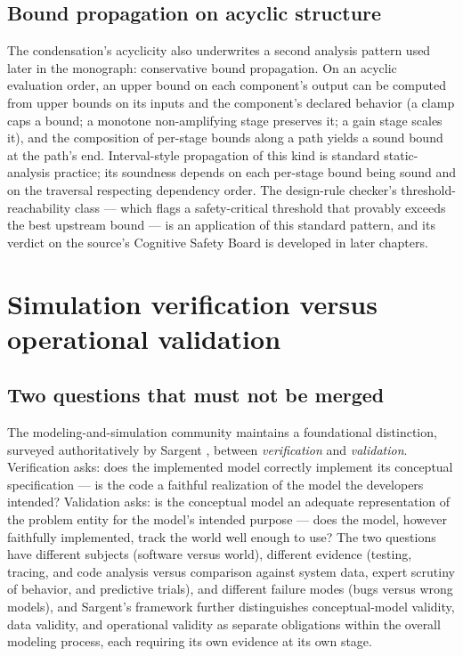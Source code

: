 \subsection{Bound propagation on acyclic structure}\label{ch02:graphs:bounds}

The condensation's acyclicity also underwrites a second analysis pattern
used later in the monograph: conservative bound propagation. On an
acyclic evaluation order, an upper bound on each component's output can
be computed from upper bounds on its inputs and the component's declared
behavior (a clamp caps a bound; a monotone non-amplifying stage preserves
it; a gain stage scales it), and the composition of per-stage bounds
along a path yields a sound bound at the path's end. Interval-style
propagation of this kind is standard static-analysis practice; its
soundness depends on each per-stage bound being sound and on the
traversal respecting dependency order. The design-rule checker's
threshold-reachability class --- which flags a safety-critical threshold
that provably exceeds the best upstream bound --- is an application of
this standard pattern, and its verdict on the source's Cognitive Safety
Board is developed in later chapters.

\section{Simulation verification versus operational validation}\label{ch02:vandv}

\subsection{Two questions that must not be merged}\label{ch02:vandv:questions}

The modeling-and-simulation community maintains a foundational distinction,
surveyed authoritatively by Sargent \cite{sargent}, between
\emph{verification} and \emph{validation}. Verification asks: does the
implemented model correctly implement its conceptual specification --- is
the code a faithful realization of the model the developers intended?
Validation asks: is the conceptual model an adequate representation of the
problem entity for the model's intended purpose --- does the model,
however faithfully implemented, track the world well enough to use? The
two questions have different subjects (software versus world), different
evidence (testing, tracing, and code analysis versus comparison against
system data, expert scrutiny of behavior, and predictive trials), and
different failure modes (bugs versus wrong models), and Sargent's
framework further distinguishes conceptual-model validity, data validity,
and operational validity as separate obligations within the overall
modeling process, each requiring its own evidence at its own stage.

